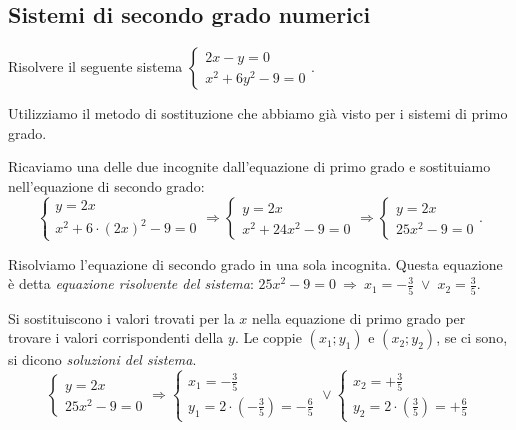 \subsection{Sistemi di secondo grado numerici}
\begin{exrig}
\begin{esempio}
Risolvere il seguente sistema $\left\{\begin{array}{l}{2x-y=0}\\{x^2+6y^2-9=0}\end{array}\right..$

Utilizziamo il metodo di sostituzione che abbiamo già visto per i sistemi di primo grado.
\begin{itemize*}
\item Ricaviamo una delle due incognite dall'equazione di primo grado e sostituiamo nell'equazione di secondo grado:
\[\left\{\begin{array}{l}y=2x \\
x^2+6\cdot (2x)^2-9=0\end{array}\right. 
\Rightarrow\left\{\begin{array}{l}y=2x \\
x^2+24x^2-9=0\end{array}\right. 
\Rightarrow \left\{\begin{array}{l}y=2x \\
25x^2-9=0\end{array}\right..\]
\item Risolviamo l'equazione di secondo grado in una sola incognita. Questa equazione è detta \emph{equazione risolvente del sistema}:
 $25x^2-9=0\:\Rightarrow\: x_1=-\frac 3 5\;\vee\; x_2=\frac 3 5$.
\item Si sostituiscono i valori trovati per la $x$ nella equazione di primo grado per trovare i valori corrispondenti della $y$. Le coppie $(x_1;y_1)$ e $(x_2;y_2)$, se ci sono, si dicono \emph{soluzioni del sistema}.
\[\left\{\begin{array}{l}{y=2x}\\
{25x^2-9=0}\end{array}\right. 
\Rightarrow \left\{\begin{array}{l}x_1=-\frac 3 5 \\
y_1=2\cdot \left(-\frac 3 5\right)=-\frac 6 5\end{array}\right.\vee 
\left\{\begin{array}{l}x_2=+\frac 3 5 \\
y_2=2\cdot \left(\frac 3 5\right)=+\frac 6 5 \end{array}\right.\] 

\end{itemize*}
\end{esempio}
\end{exrig}
